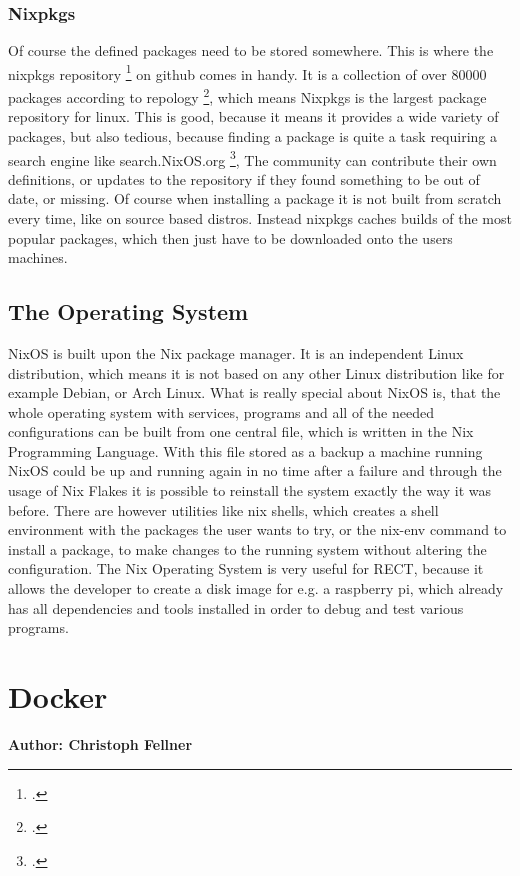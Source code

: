 \subsubsection{Nixpkgs}
Of course the defined packages need to be stored somewhere. This is where the nixpkgs repository \footcite{nixpkgs-repo} on github comes in handy. It is a collection of over 80000 packages according to repology \footcite{repology_nixpkgs}, 
which means Nixpkgs is the largest package repository for linux. This is good, because it means it provides a wide variety of packages, but also tedious, because finding a package is quite a task requiring a search engine like search.NixOS.org \footcite{search-nixos-org}, 
The community can contribute their own definitions, or updates to the repository if they found something to be out of date, or missing. Of course when installing a package it is not built from scratch every time, like on source based distros.
Instead nixpkgs caches builds of the most popular packages, which then just have to be downloaded onto the users machines.

\subsection{The Operating System}
NixOS is built upon the Nix package manager. It is an independent Linux distribution, which means it is not based on any other Linux distribution like for example Debian, or Arch Linux.
What is really special about NixOS is, that the whole operating system with services, programs and all of the needed configurations can be built from one central file, which is written in the Nix Programming Language.
With this file stored as a backup a machine running NixOS could be up and running again in no time after a failure and through the usage of Nix Flakes it is possible to reinstall the system exactly the way it was before.
There are however utilities like nix shells, which creates a shell environment with the packages the user wants to try, or the nix-env command to install a package, to make changes to the running system without altering the configuration.
The Nix Operating System is very useful for RECT, because it allows the developer to create a disk image for e.g. a raspberry pi, which already has all dependencies and tools installed in order to debug and test various programs.


\section{Docker}
\textbf{Author: Christoph Fellner}

